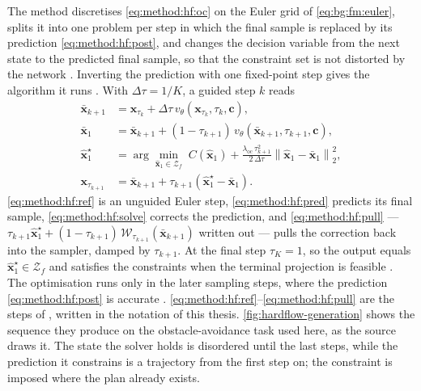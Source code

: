 \documentclass[headsepline,footsepline,footinclude=false,oneside,fontsize=11pt,paper=a4,listof=totoc,bibliography=totoc]{scrbook}
\theoremstyle{definition}
\theoremstyle{plain}
\theoremstyle{remark}
\newcommand{\vect}[1]{\boldsymbol{#1}}
\newcommand{\sidx}[1]{_{\textrm{#1}}}
\newcommand{\vfield}{v}                        %
\newcommand{\ftime}{\tau}                      %
\newcommand{\nfe}{K}                           %
\begin{document}
The method discretises \eqref{eq:method:hf:oc} on the Euler grid of \eqref{eq:bg:fm:euler}, splits it into
one problem per step in which the final sample is replaced by its prediction
\eqref{eq:method:hf:post}, and changes the decision variable from the next state to the predicted final
sample, so that the constraint set is not distorted by the network \parencite[Problems~2--5]{li2025hardflow}.
Inverting the prediction with one fixed-point step gives the algorithm it runs
\parencite[Algorithm~1]{li2025hardflow}. With $\Delta\ftime = 1/\nfe$, a guided step $k$ reads
\begin{align}
  \bar{\vect{x}}_{k+1} &= \vect{x}_{\ftime_{k}}
    + \Delta\ftime\,\vfield_{\theta}(\vect{x}_{\ftime_{k}},\ftime_{k},\vect{c}),
    \label{eq:method:hf:ref}\\
  \bar{\vect{x}}_{1} &= \bar{\vect{x}}_{k+1}
    + (1-\ftime_{k+1})\,\vfield_{\theta}(\bar{\vect{x}}_{k+1},\ftime_{k+1},\vect{c}),
    \label{eq:method:hf:pred}\\
  \hat{\vect{x}}_{1}^{\star} &= \arg\min_{\hat{\vect{x}}_{1}\in\mathcal{Z}_{f}}\;
    C(\hat{\vect{x}}_{1})
    + \frac{\lambda\sidx{oc}\,\ftime_{k+1}^{2}}{2\,\Delta\ftime}\left\|\hat{\vect{x}}_{1}-\bar{\vect{x}}_{1}\right\|_{2}^{2},
    \label{eq:method:hf:solve}\\
  \vect{x}_{\ftime_{k+1}} &= \bar{\vect{x}}_{k+1} + \ftime_{k+1}\left(\hat{\vect{x}}_{1}^{\star}-\bar{\vect{x}}_{1}\right).
    \label{eq:method:hf:pull}
\end{align}
\eqref{eq:method:hf:ref} is an unguided Euler step, \eqref{eq:method:hf:pred} predicts its final sample,
\eqref{eq:method:hf:solve} corrects the prediction, and \eqref{eq:method:hf:pull} ---
$\ftime_{k+1}\hat{\vect{x}}_{1}^{\star} + (1-\ftime_{k+1})\,\mathcal{W}_{\ftime_{k+1}}(\bar{\vect{x}}_{k+1})$
written out --- pulls the correction back into the sampler, damped by $\ftime_{k+1}$. At the final step
$\ftime_{\nfe} = 1$, so the output equals $\hat{\vect{x}}_{1}^{\star}\in\mathcal{Z}_{f}$ and satisfies the
constraints when the terminal projection is feasible \parencite[Prop.~1]{li2025hardflow}. The optimisation runs only in the later sampling
steps, where the prediction \eqref{eq:method:hf:post} is accurate \parencite{li2025hardflow}.
\eqref{eq:method:hf:ref}--\eqref{eq:method:hf:pull} are the steps of
\parencite[Alg.~1]{li2025hardflow}, written in the notation of this thesis.
\autoref{fig:hardflow-generation} shows the sequence they produce on the obstacle-avoidance task
used here, as the source draws it. The state the solver holds is disordered until the last steps,
while the prediction it constrains is a trajectory from the first step on; the constraint is
imposed where the plan already exists.
\end{document}
